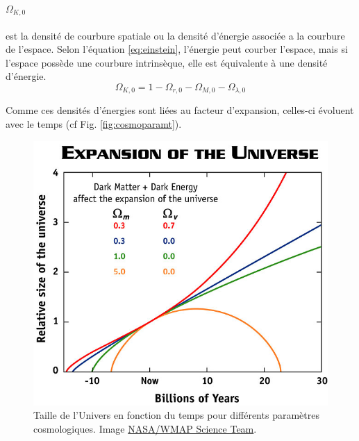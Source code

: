 \paragraph{$\Omega_{K,0}$} est la densité de courbure spatiale ou la densité d'énergie associée a la courbure de l'espace.
Selon l’équation \ref{eq:einstein}, l'énergie peut courber l'espace, mais si l'espace possède une courbure intrinsèque, elle est équivalente à une densité d'énergie.
\begin{equation}
\Omega_{K,0} = 1 - \Omega_{r,0} - \Omega_{M,0} - \Omega_{\lambda,0} 
\end{equation}

Comme ces densités d'énergies sont liées au facteur d'expansion, celles-ci évoluent avec le temps (cf Fig. \ref{fig:cosmoparamt}).

\begin{figure}
        \includegraphics[width=.9\linewidth]{img/01/scale_t.jpg} 
        \caption[Taille de l'Univers]{Taille de l'Univers en fonction du temps pour différents paramètres cosmologiques.
		Image \href{https://map.gsfc.nasa.gov/universe/bb_concepts_exp.html}{NASA/WMAP Science Team}.
 		\label{fig:scale_t}}
\end{figure}

